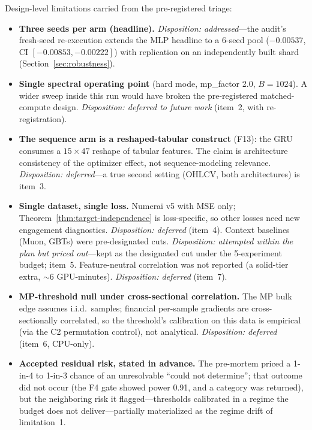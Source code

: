 \noindent Design-level limitations carried from the pre-registered triage:

\begin{itemize}
  \item \textbf{Three seeds per arm (headline).} \emph{Disposition:
    addressed}---the audit's fresh-seed re-execution extends the MLP
    headline to a 6-seed pool ($-0.00537$, CI $[-0.00853, -0.00222]$) with
    replication on an independently built shard
    (Section~\ref{sec:robustness}).
  \item \textbf{Single spectral operating point} (hard mode, mp\_factor
    2.0, $B{=}1024$). A wider sweep inside this run would have broken the
    pre-registered matched-compute design. \emph{Disposition: deferred to
    future work} (item~2, with re-registration).
  \item \textbf{The sequence arm is a reshaped-tabular construct} (F13):
    the GRU consumes a $15 \times 47$ reshape of tabular features. The
    claim is architecture consistency of the optimizer effect, not
    sequence-modeling relevance. \emph{Disposition: deferred}---a true
    second setting (OHLCV, both architectures) is item~3.
  \item \textbf{Single dataset, single loss.} Numerai v5 with MSE only;
    Theorem~\ref{thm:target-independence} is loss-specific, so other losses
    need new engagement diagnostics. \emph{Disposition: deferred}
    (item~4). Context baselines (Muon, GBTs) were pre-designated cuts.
    \emph{Disposition: attempted within the plan but priced out}---kept as
    the designated cut under the 5-experiment budget; item~5.
    Feature-neutral correlation was not reported (a solid-tier extra,
    $\sim$6 GPU-minutes). \emph{Disposition: deferred} (item~7).
  \item \textbf{MP-threshold null under cross-sectional correlation.} The
    MP bulk edge assumes i.i.d.\ samples; financial per-sample gradients
    are cross-sectionally correlated, so the threshold's calibration on
    this data is empirical (via the C2 permutation control), not
    analytical. \emph{Disposition: deferred} (item~6, CPU-only).
  \item \textbf{Accepted residual risk, stated in advance.} The pre-mortem
    priced a 1-in-4 to 1-in-3 chance of an unresolvable ``could not
    determine''; that outcome did not occur (the F4 gate showed power
    0.91, and a category was returned), but the neighboring risk it
    flagged---thresholds calibrated in a regime the budget does not
    deliver---partially materialized as the regime drift of limitation~1.
\end{itemize}
